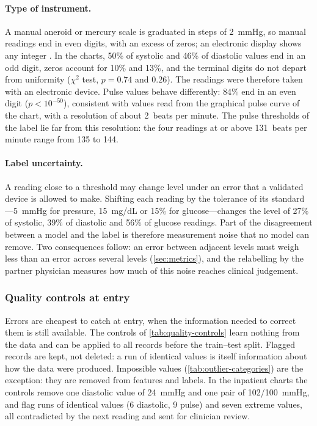 \paragraph{Type of instrument.} A manual aneroid or mercury scale is graduated in steps of 2~mmHg, so manual readings end in even digits, with an excess of zeros; an electronic display shows any integer \parencite{kottke2022}. In the charts, 50\% of systolic and 46\% of diastolic values end in an odd digit, zeros account for 10\% and 13\%, and the terminal digits do not depart from uniformity ($\chi^2$ test, $p = 0.74$ and $0.26$). The readings were therefore taken with an electronic device. Pulse values behave differently: 84\% end in an even digit ($p < 10^{-50}$), consistent with values read from the graphical pulse curve of the chart, with a resolution of about 2~beats per minute. The pulse thresholds of the label lie far from this resolution: the four readings at or above 131~beats per minute range from 135 to 144.

\paragraph{Label uncertainty.} A reading close to a threshold may change level under an error that a validated device is allowed to make. Shifting each reading by the tolerance of its standard---5~mmHg for pressure, 15~mg/dL or 15\% for glucose---changes the level of 27\% of systolic, 39\% of diastolic and 56\% of glucose readings. Part of the disagreement between a model and the label is therefore measurement noise that no model can remove. Two consequences follow: an error between adjacent levels must weigh less than an error across several levels (\cref{sec:metrics}), and the relabelling by the partner physician measures how much of this noise reaches clinical judgement.

\subsubsection{Quality controls at entry}\label{sec:quality}\label{sec:ingestion}

Errors are cheapest to catch at entry, when the information needed to correct them is still available. The controls of \cref{tab:quality-controls} learn nothing from the data and can be applied to all records before the train--test split. Flagged records are kept, not deleted: a run of identical values is itself information about how the data were produced. Impossible values (\cref{tab:outlier-categories}) are the exception: they are removed from features and labels. In the inpatient charts the controls remove one diastolic value of 24~mmHg and one pair of 102/100~mmHg, and flag runs of identical values (6 diastolic, 9 pulse) and seven extreme values, all contradicted by the next reading and sent for clinician review.


